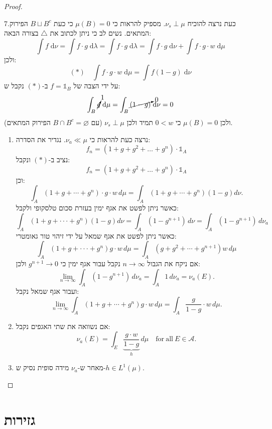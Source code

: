 \documentclass{tstextbook}
\begin{document}
\begin{proof}
\begin{enumerate}
  \end{enumerate}
7.כעת נרצה להוכיח \(\nu_{s}\perp \mu\). מספיק להראות כי \(\mu(B)=0\) כי כעת \(B \sqcup B^{c}\) הפירוק המתאים. נשים לב כי ניתן לכתוב את \(\triangle\) בצורה הבאה: 
$$\int f \;\mathrm{d} \nu =\int f\cdot g \;\mathrm{d} \lambda = \int f\cdot g \;\mathrm{d} \lambda = \int f\cdot g \;\mathrm{d} \nu+\int f\cdot g\cdot w \;\mathrm{d} \mu    $$
ולכן:
$$(*)\quad \int f\cdot g\cdot w \;\mathrm{d} \mu = \int f(1-g) \;\mathrm{d} \nu  $$
על ידי הצבה של \(f=\mathbb{1}_{B}\) ב-\((*)\) נקבל ש:
$$\int_{B} \cancelto{ 1 }{ g } \;\mathrm{d} \mu = \int_{B} \cancelto{ 0 }{ (1-g) } \;\mathrm{d} \nu  =0$$
ולכן \(\mu(B)=0\) כי \(0<w\) תמיד ולכן \(\nu_{s}\perp \mu\) (עם \(B\cap B^{c}=\varnothing\) הפירוק המתאים).

  \begin{enumerate}
    \item נרצה כעת להראות כי \(\nu_{a}\ll \mu\). נגדיר את הסדרה: 
$$f_{n}=\left( 1+g+g^{2}+\dots+ g^{n} \right)\cdot \mathbb{1} _{A}$$
נציב ב-\((*)\) ונקבל:
$$f_{n}=\left( 1+g+g^{2}+\dots+ g^{n} \right)\cdot \mathbb{1} _{A}$$
וכן:
$$\int_{A}\left(1+g+\cdots+g^{n}\right)\cdot g\cdot w\,d\mu=\int_{A}\left(1+g+\cdots+g^{n}\right)\left(1-g\right)d\nu.$$
כאשר ניתן לפשט את אגף ימין בעזרת סכום טלסקופי ולקבל:
$$\int_{A}\left(1+g+\cdot\cdot\cdot+g^{n}\right)\left(1-g\right)d\nu=\int_{A}\left(1-g^{n+1}\right)\,d\nu=\int_{A}\left(1-g^{n+1}\right)\,d\nu_{a}$$
כאשר ניתן לפשט את אגף שמאל על ידי זיהוי טור גאומטרי:
$$\int_{A}\left(1+g+\cdot\cdot\cdot+g^{n}\right)g\cdot w\,d\mu=\int_{A}\left(g+g^{2}+\cdots+g^{n+1}\right)w\,d\mu$$
אם ניקח את הגבול \(n\to \infty\) נקבל עבור אגף ימין כי \(g^{n+1}\to 0\) ולכן:
$$\operatorname*{lim}_{n\to\infty}\int_{A}\left(1-g^{n+1}\right)\,d\nu_{a}=\int_{A}1\,d\nu_{a}=\nu_{a}(E).$$
ועבור אגף שמאל נקבל:
$$\operatorname*{lim}_{n\to\infty}\int_{A}\left(1+g+\cdots+g^{n}\right)g\cdot w\,d\mu=\int_{A}{\frac{g}{1-g}}\cdot w\,d\mu.$$


    \item אם נשוואה את שתי האגפים נקבל: 
$$\nu_{a}(E)=\int_{E}\underbrace{\frac{g\cdot w}{1-g}}_{h}\,d\mu\quad\mathrm{for~all~}E\in\mathcal{A}.$$


    \item מאחר ש-\(\nu_{a}\) מידה סופית נסיק ש-\(h \in L^{1}\left( \mu \right)\). 


  \end{enumerate}
\end{proof}
\chapter{גזירות}
\end{document}
